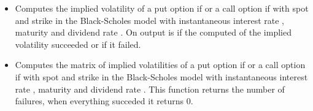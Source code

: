 \begin{itemize}
\item 
  \sshortdescribe Computes the implied volatility of a put option if
   or a call option if  with spot  and
  strike  in the Black-Scholes model with instantaneous interest rate
  , maturity  and dividend rate . On output
   is  if the computed of the implied volatility succeeded
  or  if it failed.

\item 
  \sshortdescribe Computes the matrix of implied volatilities 
  of a put option if  or a call option if
   with spot  and strike  in the
  Black-Scholes model with instantaneous interest rate , maturity
   and dividend rate . This function returns the number
  of failures, when everything succeded it returns $0$.
\end{itemize}


